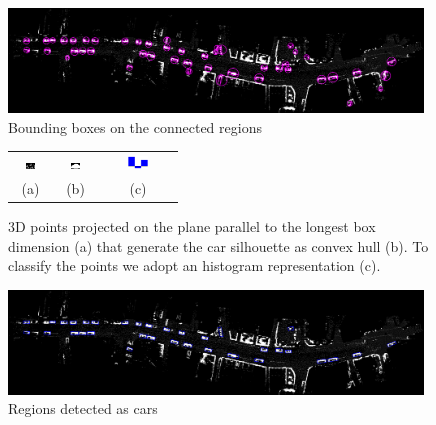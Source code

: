 \begin{figure}[tp]
 \centering
 \includegraphics[width=0.98\textwidth]{./img/ch-laser/pointsprojectedErodedWithBoundingBoxes.png}
 \caption{Bounding boxes on the connected regions}
 \label{fig:pointsprojectedErodedWithBoundingBoxes}
\end{figure}

\begin{figure}[tp]
    \centering
    \begin{tabular}{ccc}
        \includegraphics[width=0.3\textwidth]{./img/ch-laser/CurProj.png}&
        \includegraphics[width=0.3\textwidth]{./img/ch-laser/convHull.png}&
        \includegraphics[width=0.3\textwidth]{./img/ch-laser/hist}\\
        (a)&(b)&(c)
    \end{tabular}
    \caption{3D points projected on the plane parallel to the longest box  dimension (a) that generate the car silhouette as convex hull (b). To classify the points we adopt an histogram representation (c).}
    \label{fig:convHull}
\end{figure}

\begin{figure}[tp]
 \centering
 \includegraphics[width=0.98\textwidth]{./img/ch-laser/drawing.png}
 \caption{Regions detected as cars}
 \label{fig:drawing}
\end{figure}


